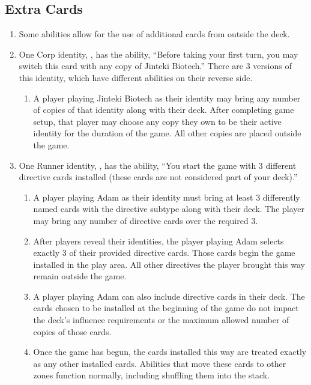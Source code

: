 \subsection{Extra Cards}
\begin{enumerate}
	\item Some abilities allow for the use of additional cards from outside the deck.
	\item One Corp identity, , has the ability, ``Before taking your first turn, you may \textcolor{Bittersweet}{switch} this card with any copy of Jinteki Biotech.'' There are 3 versions of this identity, which have different abilities on their reverse side.
	      \begin{enumerate}
		      \item A player \textcolor{Bittersweet}{playing} Jinteki Biotech as their identity may bring any number of copies of that identity along with their deck. After completing game setup, that player may choose any copy they own to be their active identity for the duration of the game. All other copies are placed outside the game.
	      \end{enumerate}
	\item One Runner identity, , has the ability, ``You start the game with 3 different directive cards installed (these cards are not considered part of your deck).''
	      \begin{enumerate}
		      \item A player \textcolor{Bittersweet}{playing} Adam as their identity must bring at least 3 differently named cards with the directive subtype along with their deck. The player may bring any number of directive cards over the required 3.
		      \item After players reveal their identities, the player \textcolor{Bittersweet}{playing} Adam selects exactly 3 of their provided directive cards. Those cards begin the game installed in the play area. All other directives the player brought this way remain outside the game.
		      \item A player \textcolor{Bittersweet}{playing} Adam can also include directive cards in their deck. The cards chosen to be installed at the beginning of the game do not impact the deck's influence requirements or the maximum allowed number of copies of those cards.
		      \item Once the game has begun, the cards installed this way are treated exactly as any other installed cards. Abilities that move these cards to other zones function normally, including shuffling them into the stack.

\end{enumerate}
\end{enumerate}
